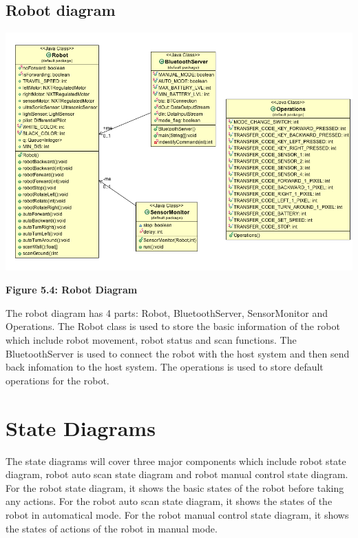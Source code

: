 \documentclass[11pt, a4paper]{report}
\begin{document}
\subsection{Robot diagram}
 \begin{center}
 \includegraphics[width=18.20cm]{Robot.png}
\end{center}
\begin{center}
\textbf {Figure 5.4: Robot Diagram} \\[0.3cm]
\end{center}
The robot diagram has 4 parts: Robot, BluetoothServer, SensorMonitor and Operations. The Robot class is used to store the basic information of the robot which include robot movement, robot status and scan functions. The BluetoothServer is used to connect the robot with the host system and then send back infomation to the host system. The operations is used to store default operations for the robot. 
\pagebreak

\section{State Diagrams}
The state diagrams will cover three major components which include robot state diagram, robot auto scan state diagram and  robot manual control state diagram. For the robot state diagram, it shows the basic states of the robot before taking any actions. For the robot auto scan state diagram, it shows the states of the robot in automatical mode. For the robot manual control state diagram, it shows the states of actions of the robot in manual mode.
\end{document}
